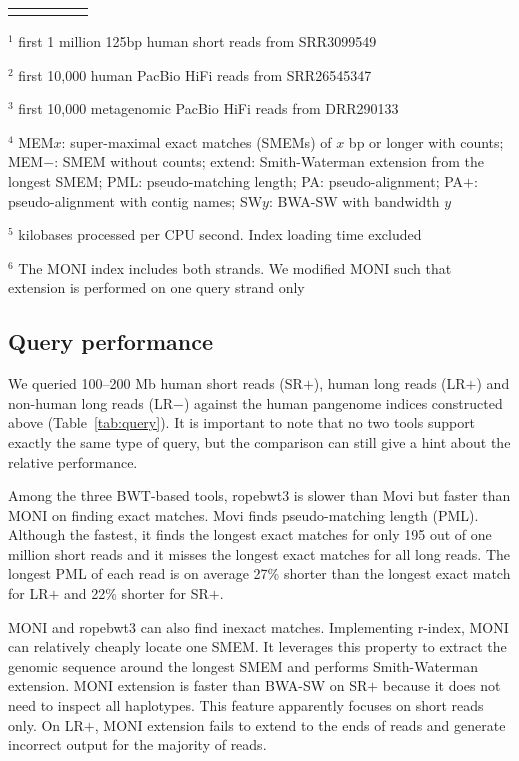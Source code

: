 \documentclass[webpdf,contemporary,large,namedate]{oup-authoring-template}%
\begin{document}
\begin{table}[!tb]
\begin{tabular*}{\columnwidth}{@{\extracolsep\fill}lllrr@{\extracolsep\fill}}
\botrule
\end{tabular*}
\begin{tablenotes}\setlength\itemsep{0.0em}
\item[$^1$] first 1 million 125bp human short reads from SRR3099549
\item[$^2$] first 10,000 human PacBio HiFi reads from SRR26545347
\item[$^3$] first 10,000 metagenomic PacBio HiFi reads from DRR290133
\item[$^4$] MEM$x$: super-maximal exact matches (SMEMs) of $x$ bp or longer with counts;
MEM$-$: SMEM without counts;
extend: Smith-Waterman extension from the longest SMEM;
PML: pseudo-matching length; PA: pseudo-alignment; PA$+$: pseudo-alignment with contig names;
SW$y$: BWA-SW with bandwidth $y$
\item[$^5$] kilobases processed per CPU second. Index loading time excluded
\item[$^6$] The MONI index includes both strands.
We modified MONI such that extension is performed on one query strand only
\end{tablenotes}
\end{table}

\subsection{Query performance}

We queried 100--200 Mb human short reads (SR$+$), human long reads (LR$+$) and non-human long reads (LR$-$) against the human pangenome indices constructed above (Table~\ref{tab:query}).
It is important to note that no two tools support exactly the same type of query,
but the comparison can still give a hint about the relative performance.

Among the three BWT-based tools, ropebwt3 is slower than Movi but faster than MONI on finding exact matches.
Movi finds pseudo-matching length (PML).
Although the fastest, it finds the longest exact matches for only 195 out of one million short reads
and it misses the longest exact matches for all long reads.
The longest PML of each read is on average 27\% shorter than the longest exact match for LR$+$ and 22\% shorter for SR$+$.

MONI and ropebwt3 can also find inexact matches.
Implementing r-index, MONI can relatively cheaply locate one SMEM.
It leverages this property to extract the genomic sequence around the longest SMEM and performs Smith-Waterman extension.
MONI extension is faster than BWA-SW on SR$+$ because it does not need to inspect all haplotypes.
This feature apparently focuses on short reads only.
On LR$+$, MONI extension fails to extend to the ends of reads and generate incorrect output for the majority of reads.
\end{document}
